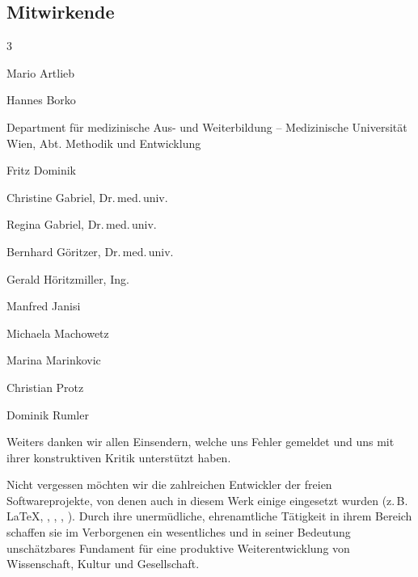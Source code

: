 \begin{WidePar}
\begin{raggedright}

\clearpage %
\subsection*{Mitwirkende}

\begin{multicols}{3}\FontSansNarrowFamily\small

\begin{compactitem}
  \item Mario Artlieb
  \item Hannes Borko
  \item Department für medizinische Aus- und Weiterbildung -- Medizinische
  Universität Wien, Abt. Methodik und Entwicklung
  \item Fritz Dominik
  \item Christine Gabriel, Dr.\,med.\,univ.
  \item Regina Gabriel, Dr.\,med.\,univ.
  \item Bernhard Göritzer, Dr.\,med.\,univ.
  \item Gerald Höritzmiller, Ing.
  \item Manfred Janisi
  \item Michaela Machowetz
  \item Marina Marinkovic
  \item Christian Protz
  \item Dominik Rumler
\end{compactitem}

\bigskip

Weiters danken wir allen Einsendern, welche uns Fehler gemeldet und
uns mit ihrer konstruktiven Kritik unterstützt haben.

\bigskip

Nicht vergessen möchten wir die zahlreichen
Entwickler der freien Softwareprojekte, von denen auch in
diesem Werk einige eingesetzt wurden (z.\,B. \LaTeX,
, , , ). Durch ihre unermüdliche, ehrenamtliche Tätigkeit in ihrem Bereich schaffen sie im
Verborgenen ein wesentliches und in seiner
Bedeutung unschätzbares Fundament für eine
produktive Weiterentwicklung von Wissenschaft, Kultur und Gesellschaft.

\end{multicols}
\end{raggedright}
\end{WidePar}






